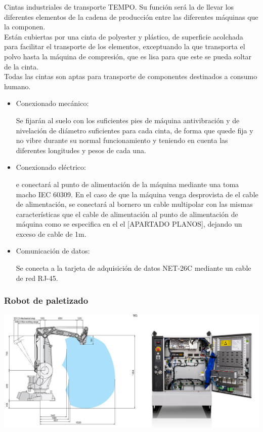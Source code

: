 	Cintas industriales de transporte TEMPO. Su función será la de llevar los diferentes elementos de la cadena de producción entre las diferentes máquinas que la componen. \\

	Están cubiertas por una cinta de polyester y plástico, de superficie acolchada para facilitar el transporte de los elementos, exceptuando la que transporta el polvo hasta la máquina de compresión, que es lisa para que este se pueda soltar de la cinta. \\

	Todas las cintas son aptas para transporte de componentes destinados a consumo humano. 

		\begin{itemize}
				\item{Conexionado mecánico:}
				
				Se fijarán al suelo con los suficientes pies de máquina antivibración y de nivelación de diámetro suficientes para cada cinta, de forma que quede fija y no vibre durante su normal funcionamiento y teniendo en cuenta las diferentes longitudes y pesos de cada una.

				\item{Conexionado eléctrico:}

				e conectará al punto de alimentación de la máquina mediante una  toma macho IEC 60309. En el caso de que la máquina venga desprovista de el cable de alimentación, se conectará al bornero un cable multipolar con las mismas características que el cable de alimentación al punto de alimentación de máquina como se especifica en el el [APARTADO PLANOS], dejando un exceso de cable de 1m. \ 
				
				\item{Comunicación de datos:}

				Se conecta a la tarjeta de adquisición de datos NET-26C mediante un cable de red RJ-45.
		\end{itemize}


\newpage

\subsubsection{Robot de paletizado}

	\includegraphics[scale=0.3]{Datasheets/8Foto.jpg}
	
